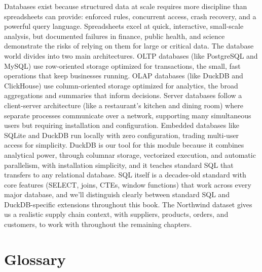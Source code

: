 \documentclass[
  letterpaper,
  DIV=11,
  numbers=noendperiod]{scrreprt}
\begin{document}
Databases exist because structured data at scale requires more
discipline than spreadsheets can provide: enforced rules, concurrent
access, crash recovery, and a powerful query language. Spreadsheets
excel at quick, interactive, small-scale analysis, but documented
failures in finance, public health, and science demonstrate the risks of
relying on them for large or critical data. The database world divides
into two main architectures. OLTP databases (like PostgreSQL and MySQL)
use row-oriented storage optimized for transactions, the small, fast
operations that keep businesses running. OLAP databases (like DuckDB and
ClickHouse) use column-oriented storage optimized for analytics, the
broad aggregations and summaries that inform decisions. Server databases
follow a client-server architecture (like a restaurant's kitchen and
dining room) where separate processes communicate over a network,
supporting many simultaneous users but requiring installation and
configuration. Embedded databases like SQLite and DuckDB run locally
with zero configuration, trading multi-user access for simplicity.
DuckDB is our tool for this module because it combines analytical power,
through columnar storage, vectorized execution, and automatic
parallelism, with installation simplicity, and it teaches standard SQL
that transfers to any relational database. SQL itself is a decades-old
standard with core features (SELECT, joins, CTEs, window functions) that
work across every major database, and we'll distinguish clearly between
standard SQL and DuckDB-specific extensions throughout this book. The
Northwind dataset gives us a realistic supply chain context, with
suppliers, products, orders, and customers, to work with throughout the
remaining chapters.

\section{Glossary}\label{glossary-5}
\end{document}
